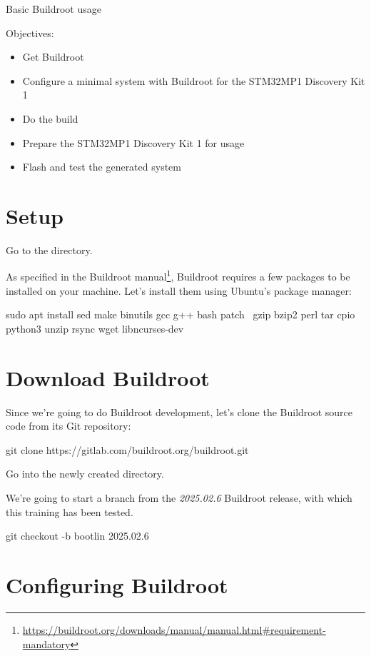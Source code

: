 \subchapter
{Basic Buildroot usage}
{Objectives:
  \begin{itemize}
  \item Get Buildroot
  \item Configure a minimal system with Buildroot for the STM32MP1 Discovery Kit 1
  \item Do the build
  \item Prepare the STM32MP1 Discovery Kit 1 for usage
  \item Flash and test the generated system
  \end{itemize}
}

\section{Setup}

Go to the  directory.

As specified in the Buildroot
manual\footnote{\url{https://buildroot.org/downloads/manual/manual.html\#requirement-mandatory}},
Buildroot requires a few packages to be installed on your
machine. Let's install them using Ubuntu's package manager:

\begin{bashinput}
sudo apt install sed make binutils gcc g++ bash patch \
  gzip bzip2 perl tar cpio python3 unzip rsync wget libncurses-dev
\end{bashinput}

\section{Download Buildroot}

Since we're going to do Buildroot development, let's clone the
Buildroot source code from its Git repository:

\begin{bashinput}
git clone https://gitlab.com/buildroot.org/buildroot.git
\end{bashinput}

Go into the newly created  directory.

We're going to start a branch from the {\em 2025.02.6} Buildroot
release, with which this training has been tested.

\begin{bashinput}
git checkout -b bootlin 2025.02.6
\end{bashinput}

\section{Configuring Buildroot}

